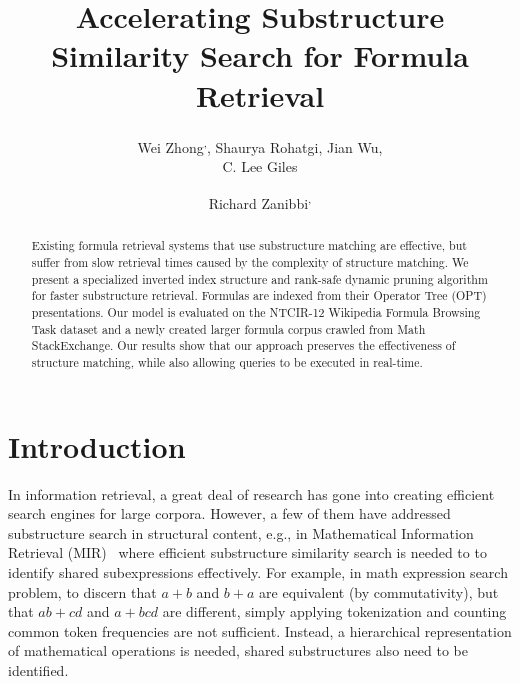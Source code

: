 \documentclass[runningheads]{llncs}
\begin{document}
%
\title{Accelerating Substructure Similarity Search for Formula Retrieval}

\author{Wei Zhong\textsuperscript{,\Letter}, Shaurya Rohatgi, Jian Wu, \\ C. Lee Giles \and Richard Zanibbi\textsuperscript{,\Letter}}


\maketitle

\begin{abstract}
Existing formula retrieval systems that use substructure matching are effective, but suffer from slow retrieval times caused by the complexity of structure matching.  We present a specialized inverted index structure and rank-safe dynamic pruning algorithm for faster substructure retrieval. Formulas are indexed from their Operator Tree (OPT) presentations. Our model is evaluated on the NTCIR-12 Wikipedia Formula Browsing Task dataset and a newly created larger formula corpus crawled from Math StackExchange.  Our results show that
our approach preserves the effectiveness of structure matching, while also allowing queries to be executed in real-time.

\end{abstract}

\section{Introduction}
In information retrieval, a great deal of research has gone into creating efficient search engines for large corpora.
However, a few of them have addressed substructure search in structural content, e.g., in Mathematical Information Retrieval (MIR)~\cite{survey2012} where efficient substructure similarity search is needed to to identify shared subexpressions effectively.
For example, in math expression search problem, to discern that $a+b$ and $b + a$ are equivalent (by commutativity), but that $ab+cd$ and $a+bcd$ are different, simply applying tokenization and counting common token frequencies are not sufficient. Instead, a hierarchical representation of mathematical operations is needed, shared substructures also need to be identified.
\end{document}
